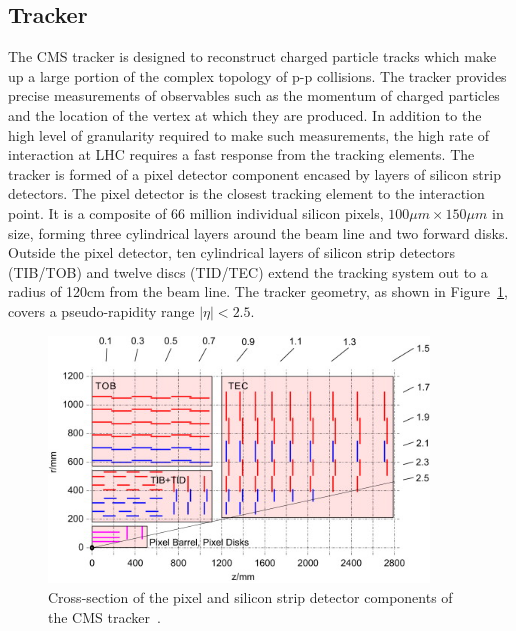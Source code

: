 \subsection{Tracker}
The CMS tracker is designed to reconstruct charged particle tracks 
which make up a large portion of the complex topology of 
p-p collisions. The tracker provides precise measurements of 
observables such as the momentum of charged particles and the location of the
vertex at which they are produced.
In addition to the high level of granularity required to make such measurements, the 
high rate of interaction at LHC requires a fast response from the tracking 
elements. 
The tracker is formed of a pixel detector component encased by layers of silicon strip detectors.
The pixel detector is the closest tracking element to the interaction point. 
It is a composite of 66 million individual silicon pixels, $100\mu m \times 150 \mu m$ in size,
forming three cylindrical layers around the beam line and two forward disks. 
Outside the pixel detector, ten cylindrical layers of silicon strip detectors (TIB/TOB) 
and twelve discs (TID/TEC) extend the tracking system out to a radius of 120cm from the 
beam line. The tracker geometry, as shown in Figure~\ref{fig:trackergeom}, covers a pseudo-rapidity 
range $|\eta| < 2.5$.

\begin{figure}
	\centering
	\includegraphics[width=0.9\textwidth]{detector/trcker/tracker_col.jpg}
	\caption{Cross-section of the pixel and silicon strip detector 
	components of the CMS tracker~\citep{Weber201159}.}
   \label{fig:trackergeom}
\end{figure}

